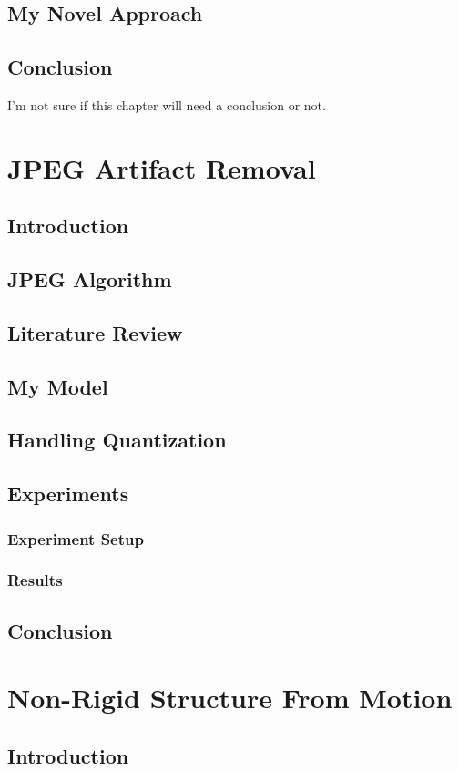 \documentclass{article}
\begin{document}
\subsection{My Novel Approach}
\subsection{Conclusion}
I'm not sure if this chapter will need a conclusion or not.

\section{JPEG Artifact Removal}
\subsection{Introduction}
\subsection{JPEG Algorithm}
\subsection{Literature Review}
\subsection{My Model}
\subsection{Handling Quantization}
\subsection{Experiments}
\subsubsection{Experiment Setup}
\subsubsection{Results}
\subsection{Conclusion}

\section{Non-Rigid Structure From Motion}
\subsection{Introduction}
\end{document}
